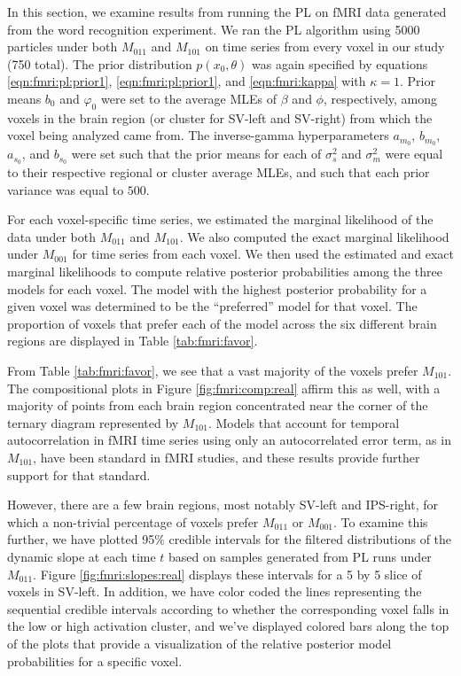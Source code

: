 In this section, we examine results from running the PL on fMRI data generated from the word recognition experiment. We ran the PL algorithm using 5000 particles under both $M_{011}$ and $M_{101}$ on time series from every voxel in our study (750 total). The prior distribution $p(x_0,\theta)$ was again specified by equations \eqref{eqn:fmri:pl:prior1}, \eqref{eqn:fmri:pl:prior1}, and \eqref{eqn:fmri:kappa} with $\kappa = 1$. Prior means $b_0$ and $\varphi_0$ were set to the average MLEs of $\beta$ and $\phi$, respectively, among voxels in the brain region (or cluster for SV-left and SV-right) from which the voxel being analyzed came from. The inverse-gamma hyperparameters $a_{m_0}$, $b_{m_0}$, $a_{s_0}$, and $b_{s_0}$ were set such that the prior means for each of $\sigma^2_s$ and $\sigma^2_m$ were equal to their respective regional or cluster average MLEs, and such that each prior variance was equal to $500$.

For each voxel-specific time series, we estimated the marginal likelihood of the data under both $M_{011}$ and $M_{101}$. We also computed the exact marginal likelihood under $M_{001}$ for time series from each voxel. We then used the estimated and exact marginal likelihoods to compute relative posterior probabilities among the three models for each voxel. The model with the highest posterior probability for a given voxel was determined to be the ``preferred'' model for that voxel. The proportion of voxels that prefer each of the model across the six different brain regions are displayed in Table \ref{tab:fmri:favor}.

From Table \ref{tab:fmri:favor}, we see that a vast majority of the voxels prefer $M_{101}$. The compositional plots in Figure \ref{fig:fmri:comp:real} affirm this as well, with a majority of points from each brain region concentrated near the corner of the ternary diagram represented by $M_{101}$. Models that account for temporal autocorrelation in fMRI time series using only an autocorrelated error term, as in $M_{101}$, have been standard in fMRI studies, and these results provide further support for that standard.

However, there are a few brain regions, most notably SV-left and IPS-right, for which a non-trivial percentage of voxels prefer $M_{011}$ or $M_{001}$. To examine this further, we have plotted 95\% credible intervals for the filtered distributions of the dynamic slope at each time $t$ based on samples generated from PL runs under $M_{011}$. Figure \ref{fig:fmri:slopes:real} displays these intervals for a 5 by 5 slice of voxels in SV-left. In addition, we have color coded the lines representing the sequential credible intervals according to whether the corresponding voxel falls in the low or high activation cluster, and we've displayed colored bars along the top of the plots that provide a visualization of the relative posterior model probabilities for a specific voxel.

